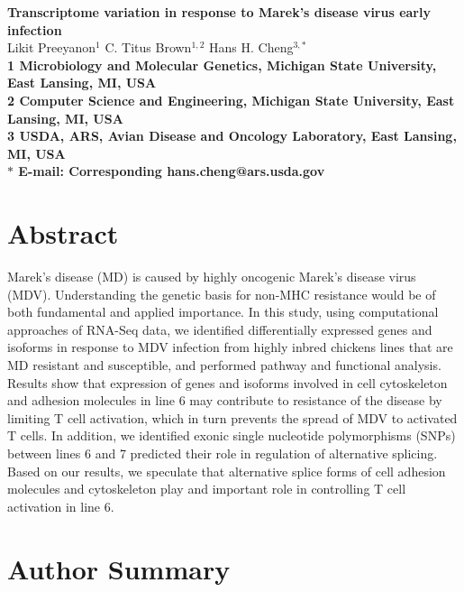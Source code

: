 \documentclass[10pt]{article}
\date{}
\begin{document}
\begin{flushleft}
{\Large
\textbf{Transcriptome variation in response to Marek's disease virus early infection}
}
\\
Likit Preeyanon$^{1}$
C. Titus Brown$^{1,2}$
Hans H. Cheng$^{3,\ast}$
\\
\bf{1} Microbiology and Molecular Genetics, Michigan State University, East Lansing, MI, USA
\\
\bf{2} Computer Science and Engineering, Michigan State University, East Lansing, MI, USA
\\
\bf{3} USDA, ARS, Avian Disease and Oncology Laboratory, East Lansing, MI, USA
\\
$\ast$ E-mail: Corresponding hans.cheng@ars.usda.gov
\end{flushleft}

\section*{Abstract}
Marek's disease (MD) is caused by highly oncogenic Marek's disease virus (MDV).
Understanding the genetic basis for non-MHC resistance would be of both fundamental and applied importance.
In this study, using computational approaches of RNA-Seq data, we identified
differentially expressed genes and isoforms in response to MDV infection
from highly inbred chickens lines that are MD resistant and susceptible,
and performed pathway and functional analysis.
Results show that expression of genes and isoforms involved in cell cytoskeleton and
adhesion molecules in line 6 may contribute to resistance of the disease by limiting
T cell activation, which in turn prevents the spread of MDV to activated T cells.
In addition, we identified exonic single nucleotide polymorphisms (SNPs) between
lines 6 and 7 predicted their role in regulation of alternative splicing.
Based on our results, we speculate that alternative splice forms of cell adhesion molecules
and cytoskeleton play and important role in controlling T cell activation in line 6.

\section*{Author Summary}
\end{document}
